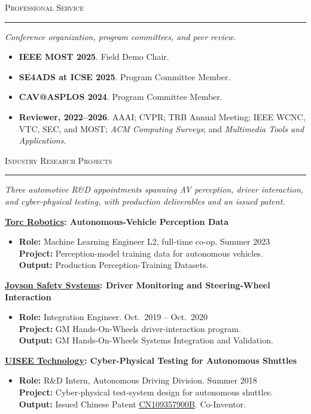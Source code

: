 \documentclass[11pt]{article}
\let\cvplainhref\href
\renewcommand{\href}[2]{\cvplainhref{#1}{\uline{#2}}}
\newcommand{\cvsection}[1]{%
  \Needspace{5\baselineskip}%
  \vspace{0.62em}%
  {\large\scshape #1}\par
  \vspace{0.12em}\hrule\vspace{0.32em}
}
\newcommand{\cvsubsection}[1]{%
  \Needspace{3\baselineskip}%
  \vspace{0.32em}%
  {\bfseries #1}\par
  \vspace{0.12em}
}
\newcommand{\cvsummary}[1]{%
  {\itshape #1}\par
  \vspace{0.18em}
}
\begin{document}
\cvsection{Professional Service}
\cvsummary{Conference organization, program committees, and peer review.}
\begin{itemize}
    \item \textbf{IEEE MOST 2025}. Field Demo Chair.
    \item \textbf{SE4ADS at ICSE 2025}. Program Committee Member.
    \item \textbf{CAV@ASPLOS 2024}. Program Committee Member.
    \item \textbf{Reviewer, 2022--2026}. AAAI; CVPR; TRB Annual Meeting; IEEE WCNC, VTC, SEC, and MOST; \textit{ACM Computing Surveys}; and \textit{Multimedia Tools and Applications}.
\end{itemize}

\cvsection{Industry Research Projects}
\cvsummary{Three automotive R\&D appointments spanning AV perception, driver interaction, and
cyber-physical testing, with production deliverables and an issued patent.}

\cvsubsection{\href{https://torc.ai/}{Torc Robotics}: Autonomous-Vehicle Perception Data}
\begin{itemize}
    \item \textbf{Role:} Machine Learning Engineer L2, full-time co-op. \hfill Summer 2023\\
    \textbf{Project:} Perception-model training data for autonomous vehicles.\\
    \textbf{Output:} Production Perception-Training Datasets.
\end{itemize}

\cvsubsection{\href{https://www.joysonsafety.com/}{Joyson Safety Systems}: Driver Monitoring and Steering-Wheel Interaction}
\begin{itemize}
    \item \textbf{Role:} Integration Engineer. \hfill Oct.\ 2019 -- Oct.\ 2020\\
    \textbf{Project:} GM Hands-On-Wheels driver-interaction program.\\
    \textbf{Output:} GM Hands-On-Wheels Systems Integration and Validation.
\end{itemize}

\cvsubsection{\href{https://global.uisee.com/}{UISEE Technology}: Cyber-Physical Testing for Autonomous Shuttles}
\begin{itemize}
    \item \textbf{Role:} R\&D Intern, Autonomous Driving Division. \hfill Summer 2018\\
    \textbf{Project:} Cyber-physical test-system design for autonomous shuttles.\\
    \textbf{Output:} Issued Chinese Patent \href{https://patents.google.com/patent/CN109357900B/en}{CN109357900B}. Co-Inventor.
\end{itemize}
\end{document}
